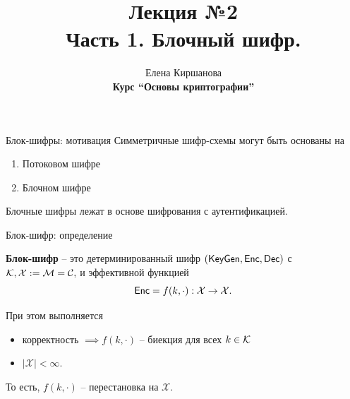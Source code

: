 \documentclass[usenames,dvipsnames,8pt,aspectratio=169]{beamer}
\title{Лекция №2 \\[10pt]
	Часть 1. Блочный шифр.}
\date{ Елена Киршанова \\  \textbf{Курс ``Основы криптографии''} \\  }
\begin{document}
	
\begin{frame}
	\titlepage
\end{frame}

%	
%	
%	
%
%
%	


\begin{frame}{Блок-шифры: мотивация}
\LARGE 
	Симметричные шифр-схемы могут быть основаны на
	
	\begin{enumerate}
		\itemsep 10pt
		\item Потоковом шифре 
		\item Блочном  шифре
	\end{enumerate}

	\vspace{20pt}
	Блочные шифры лежат в основе {\color{Orange} шифрования с аутентификацией.}
\end{frame}


\begin{frame}{Блок-шифр: определение}
\LARGE

		{\color{Orange}\textbf{Блок-шифр}} -- это {\color{Orange} детерминированный} шифр $(\textsf{KeyGen}, \textsf{Enc}, \textsf{Dec})$ с  $\mathcal{K}, \mathcal{X}:=\mathcal{M} = \mathcal{C}, $ и эффективной функцией
		\[
			\textsf{Enc} = f(k, \cdot): \mathcal{X} \rightarrow \mathcal{X}.
		\]
		
При этом выполняется
\begin{itemize}
	\item корректность $\implies f(k, \cdot)$ -- биекция для всех $k \in \mathcal{K}$ \\
	\item $|\mathcal{X}| < \infty$. \\
\end{itemize}

\vspace{20pt}

То есть, $f(k, \cdot)$ -- перестановка на $\mathcal{X}$. \\[10pt]


\end{frame}
\end{document}
